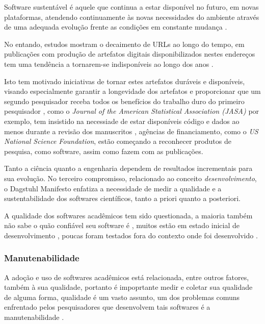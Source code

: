 Software sustentável é aquele que continua a estar disponível no futuro, em
novas plataformas, atendendo continuamente às novas necessidades do ambiente
através de uma adequada evolução frente as condições em constante mudança
\cite{allen2017engineering}.

No entando, estudos mostram o decaimento de URLs ao longo do tempo, em
publicações com produção de artefatos digitais disponibilizados nestes
endereços tem uma tendência a tornarem-se indisponíveis ao longo dos anos
\cite{wren2017use}.

Isto tem motivado iniciativas de tornar estes artefatos duráveis e disponíveis,
visando especialmente garantir a longevidade dos artefatos e proporcionar que
um segundo pesquisador receba todos os benefícios do trabalho duro do primeiro
pesquisador \cite{king1995replication},
como o {\it Journal of the American Statistical Association (JASA)} por
exemplo, tem insistido na necessiade de estar disponíveis código e dados ao
menos durante a revisão dos manuscritos \cite{baker2016scientists}, agências de
financiamento, como o {\it US National Science Foundation}, estão começando a
reconhecer produtos de pesquisa, como software, assim como fazem com as
publicações.


Tanto a ciência quanto a
engenharia dependem de resultados incrementais para sua evolução. No terceiro
compromisso, relacionado ao conceito {\it desenvolvimento}, o Dagstuhl
Manifesto enfatiza a necessidade de medir a qualidade e a sustentabilidade dos
softwares científicos, tanto a priori quanto a posteriori.

A qualidade dos softwares acadêmicos tem sido questionada,
a maioria também não sabe o quão confiável seu software é \cite{Merali2010Computational},
muitos estão em estado inicial de desenvolvimento \cite{marshall2013tools},
poucas foram testados fora do contexto onde foi desenvolvido \cite{Portillo12}.

\subsubsection{Manutenabilidade}


A adoção e uso de softwares acadêmicos está relacionada, entre outros fatores,
também à sua qualidade, portanto é impoprtante medir e coletar sua qualidade de
alguma forma, qualidade é um vasto assunto, um dos problemas comuns enfrentado
pelos pesquisadores que desenvolvem tais softwares é a manutenabilidade
\cite{Prlic2012}.

